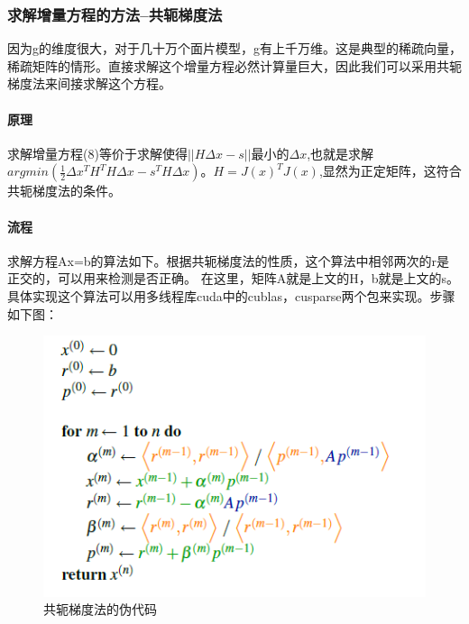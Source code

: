 \documentclass[11pt,a4,notitlepage]{article}
\begin{document}
\begin{CJK}{UTF8}{gkai}
\subsubsection*{求解增量方程的方法--共轭梯度法}%
因为g的维度很大，对于几十万个面片模型，g有上千万维。这是典型的稀疏向量，稀疏矩阵的情形。直接求解这个增量方程必然计算量巨大，因此我们可以采用共轭梯度法来间接求解这个方程。\\
\paragraph{原理}
求解增量方程(8)等价于求解使得$||H\Delta x - s||$最小的$\Delta x$,也就是求解 $argmin(\frac{1}{2}\Delta x^{T}H^{T}H\Delta x - s^{T}H\Delta x)$。$H=J(x)^{T}J(x)$,显然为正定矩阵，这符合共轭梯度法的条件。\\
\paragraph{流程}
求解方程Ax=b的算法如下。根据共轭梯度法的性质，这个算法中相邻两次的r是正交的，可以用来检测是否正确。
在这里，矩阵A就是上文的H，b就是上文的s。具体实现这个算法可以用多线程库cuda中的cublas，cusparse两个包来实现。步骤如下图：
 \begin{figure}[h]
	\centering
	\includegraphics{conjugate.png}
	\caption{共轭梯度法的伪代码}
\end{figure}


\end{CJK}
\end{document}

